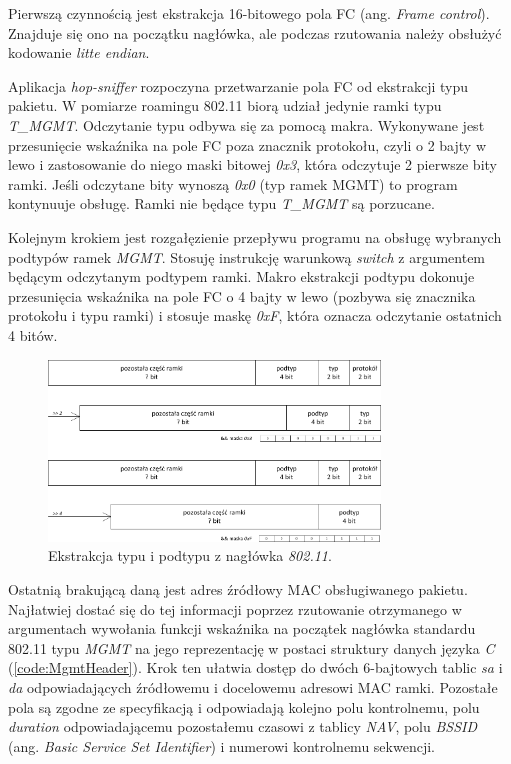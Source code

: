 Pierwszą czynnością jest ekstrakcja 16-bitowego pola FC (ang. \emph{Frame control}). Znajduje się ono na początku nagłówka, ale podczas rzutowania należy obsłużyć kodowanie \emph{litte endian}.

Aplikacja \emph{hop-sniffer} rozpoczyna przetwarzanie pola FC od ekstrakcji typu pakietu. W pomiarze roamingu 802.11 biorą udział jedynie ramki typu \emph{T\_MGMT}. Odczytanie typu odbywa się za pomocą makra. Wykonywane jest przesunięcie wskaźnika na pole FC poza znacznik protokołu, czyli o 2 bajty w lewo i zastosowanie do niego maski bitowej \emph{0x3}, która odczytuje 2 pierwsze bity ramki. Jeśli odczytane bity wynoszą \emph{0x0} (typ ramek MGMT) to program kontynuuje obsługę. Ramki nie będące typu \emph{T\_MGMT} są porzucane. 

Kolejnym krokiem jest rozgałęzienie przepływu programu na obsługę wybranych podtypów ramek \emph{MGMT}. Stosuję instrukcję warunkową \emph{switch} z argumentem będącym odczytanym podtypem ramki. Makro ekstrakcji podtypu dokonuje przesunięcia wskaźnika na pole FC o 4 bajty w lewo (pozbywa się znacznika protokołu i typu ramki) i stosuje maskę \emph{0xF}, która oznacza odczytanie ostatnich 4 bitów.

\begin{figure}[htb]
\begin{center}
\includegraphics[width=333px]{img/TypeSubtype}
\caption{Ekstrakcja typu i podtypu z nagłówka \emph{802.11}.}
\label{TypeSubtype}
\end{center}
\end{figure}

Ostatnią brakującą daną jest adres źródłowy MAC obsługiwanego pakietu. Najłatwiej dostać się do tej informacji poprzez rzutowanie otrzymanego w argumentach wywołania funkcji wskaźnika na początek nagłówka standardu 802.11 typu \emph{MGMT} na jego reprezentację w postaci struktury danych języka \emph{C} (\ref{code:MgmtHeader}). Krok ten ułatwia dostęp do dwóch 6-bajtowych tablic \emph{sa} i \emph{da} odpowiadających źródłowemu i docelowemu adresowi MAC ramki. Pozostałe pola są zgodne ze specyfikacją i odpowiadają kolejno polu kontrolnemu, polu \emph{duration} odpowiadającemu pozostałemu czasowi z tablicy \emph{NAV}, polu \emph{BSSID} (ang. \emph{Basic Service Set Identifier}) i numerowi kontrolnemu sekwencji.

